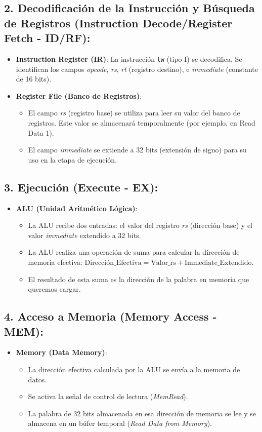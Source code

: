 \documentclass{article}
\begin{document}
\subsection*{2. Decodificación de la Instrucción y Búsqueda de Registros (Instruction Decode/Register Fetch - ID/RF):}
\begin{itemize}
    \item \textbf{Instruction Register (IR)}: La instrucción \texttt{lw} (tipo I) se decodifica. Se identifican los campos \textit{opcode}, \textit{rs}, \textit{rt} (registro destino), e \textit{immediate} (constante de 16 bits).
    \item \textbf{Register File (Banco de Registros)}:
    \begin{itemize}
        \item El campo \textit{rs} (registro base) se utiliza para leer su valor del banco de registros. Este valor se almacenará temporalmente (por ejemplo, en Read Data 1).
        \item El campo \textit{immediate} se extiende a 32 bits (extensión de signo) para su uso en la etapa de ejecución.
    \end{itemize}
\end{itemize}

\subsection*{3. Ejecución (Execute - EX):}
\begin{itemize}
    \item \textbf{ALU (Unidad Aritmético Lógica)}:
    \begin{itemize}
        \item La ALU recibe dos entradas: el valor del registro \textit{rs} (dirección base) y el valor \textit{immediate} extendido a 32 bits.
        \item La ALU realiza una operación de suma para calcular la dirección de memoria efectiva: $\text{Dirección\_Efectiva} = \text{Valor\_rs} + \text{Immediate\_Extendido}$.
        \item El resultado de esta suma es la dirección de la palabra en memoria que queremos cargar.
    \end{itemize}
\end{itemize}

\subsection*{4. Acceso a Memoria (Memory Access - MEM):}
\begin{itemize}
    \item \textbf{Memory (Data Memory)}:
    \begin{itemize}
        \item La dirección efectiva calculada por la ALU se envía a la memoria de datos.
        \item Se activa la señal de control de lectura (\textit{MemRead}).
        \item La palabra de 32 bits almacenada en esa dirección de memoria se lee y se almacena en un búfer temporal (\textit{Read Data from Memory}).
    \end{itemize}
\end{itemize}
\end{document}
